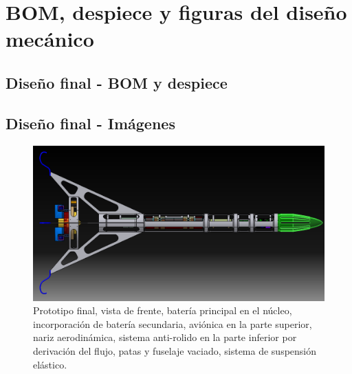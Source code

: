 \section{BOM, despiece y figuras del diseño mecánico}

\subsection{Diseño final - BOM y despiece}


\subsection{Diseño final - Imágenes}
\begin{figure}[htb]
    \centering
    \includegraphics[height=0.3\pdfpageheight]{fig/design/v6}
    \caption{Prototipo final, vista de frente, batería principal en el núcleo, incorporación de batería secundaria, aviónica en la parte superior, nariz aerodinámica, sistema anti-rolido en la parte inferior por derivación del flujo, patas y fuselaje vaciado, sistema de suspensión elástico.}
    \label{fig:design/v6}
\end{figure}

